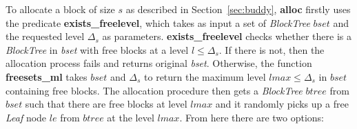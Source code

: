 %
%


To allocate a block of size $s$ as described in Section~\ref{sec:buddy}, \textbf{alloc} firstly uses the predicate \textbf{exists\_freelevel}, which takes as input a set of \emph{BlockTree} $bset$ and the requested level $\Delta_s$ as parameters. \textbf{exists\_freelevel} checks whether there is a \emph{BlockTree} in \emph{bset} with free blocks at a level $l \leq \Delta_s$. If there is not, then the allocation process fails and returns original \emph{bset}. Otherwise, the function \textbf{freesets\_ml} takes $bset$ and $\Delta_s$ to return the maximum level $lmax \leq \Delta_s$ in $bset$ containing free blocks. The allocation procedure then gets a \emph{BlockTree} $btree$ from $bset$ such that there are free blocks at level $lmax$ and it randomly picks up a free \emph{Leaf} node $le$ from $btree$ at the level $lmax$. From here there are two options:


